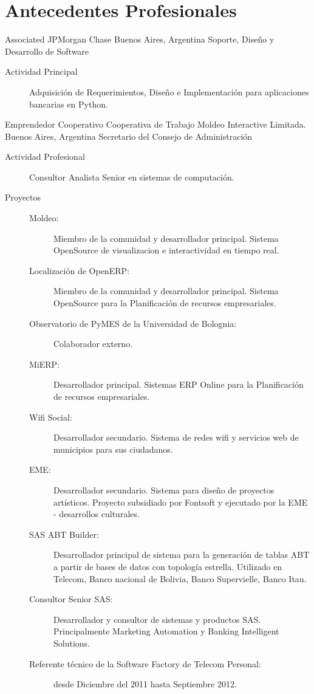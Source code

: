 \section{Antecedentes Profesionales}\label{profesional:desde}

	{Associated}
	{JPMorgan Chase}
	{Buenos Aires, Argentina}
	{Soporte, Diseño y Desarrollo de Software}
	{\begin{description}
	\item [Actividad Principal] Adquisición de Requerimientos, Diseño e Implementación para aplicaciones bancarias en Python.
	\end{description}}
	
	{Emprendedor Cooperativo}
	{Cooperativa de Trabajo Moldeo Interactive Limitada.}
	{Buenos Aires, Argentina}
	{Secretario del Consejo de Administración}
	{\begin{description}
	\item [Actividad Profesional] Consultor Analista Senior en sistemas de computación.
	\item [Proyectos]
	\begin{description}
		\item [Moldeo:] Miembro de la comunidad y desarrollador principal. Sistema OpenSource de visualizacion e interactividad en tiempo real.
		\item [Localización de OpenERP:] Miembro de la comunidad y desarrollador principal. Sistema OpenSource para la Planificación de recursos empresariales.
		\item [Observatorio de PyMES de la Universidad de Bolognia:] Colaborador externo.
		\item [MiERP:] Desarrollador principal. Sistemas ERP Online para la Planificación de recursos empresariales.
		\item [Wifi Social:] Desarrollador secundario. Sistema de redes wifi y servicios web de municipios para sus ciudadanos.
		\item [EME:] Desarrollador secundario. Sistema para diseño de proyectos artísticos. Proyecto subsidiado por Fontsoft y ejecutado por la EME - desarrollos culturales.
		\item [SAS ABT Builder:] Desarrollador principal de sistema para la generación de
			tablas ABT a partir de bases de datos con topología estrella. Utilizado
			en Telecom, Banco nacional de Bolivia, Banco Supervielle, Banco Itau.
		\item [Consultor Senior SAS:] Desarrollador y consultor de sistemas y productos SAS. Principalmente Marketing Automation y Banking Intelligent Solutions.
		\item [Referente técnico de la Software Factory de Telecom Personal:] desde Diciembre del 2011 hasta Septiembre 2012.
	\end{description}
	\end{description}}
